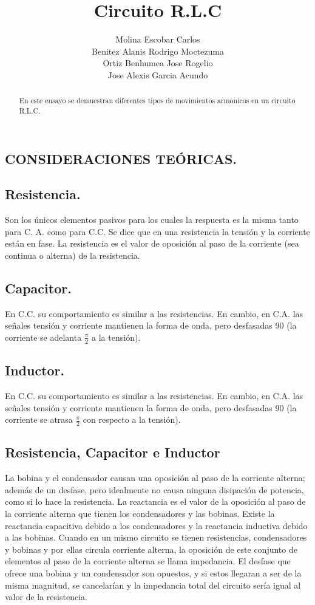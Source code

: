 \documentclass[11pt]{article}
\title{Circuito R.L.C}
\author{Molina Escobar Carlos\\Benitez Alanis Rodrigo Moctezuma\\Ortiz Benhumea Jose Rogelio\\Jose Alexis Garcia Acundo}
\date{}
\begin{document}
\maketitle

\begin{abstract}
En este ensayo se demuestran diferentes tipos de movimientos armonicos en un circuito R.L.C.
\end{abstract}


\begin{multicols}{2}

\section{CONSIDERACIONES TEÓRICAS.}
	\subsection{Resistencia.}
		Son los únicos elementos pasivos para los cuales la respuesta es la misma tanto para C. A. como para C.C. 
		Se dice que en una resistencia la tensión y la corriente están en fase.
		La resistencia es el valor de oposición al paso de la corriente (sea continua o alterna) de la resistencia.
	\subsection{Capacitor.}
		En C.C. su comportamiento es similar a las resistencias. 
		En cambio, en C.A. las señales tensión y corriente mantienen la forma de onda, pero desfasadas 90 (la corriente se adelanta $\frac{\pi}{2}$ a la tensión). 
	\subsection{Inductor.}
		En C.C. su comportamiento es similar a las resistencias.
		En cambio, en C.A. las señales tensión y corriente mantienen la forma de onda, pero desfasadas 90 (la corriente se atrasa $\frac{\pi}{2}$ con respecto a la tensión).
	\subsection{Resistencia, Capacitor e Inductor}
		La bobina y el condensador causan una oposición al paso de la corriente alterna; además de un desfase, pero idealmente no causa ninguna disipación de potencia, como si lo hace la resistencia.
		La reactancia es el valor de la oposición al paso de la corriente alterna que tienen los condensadores y las bobinas.
		Existe la reactancia capacitiva debido a los condensadores y la reactancia inductiva debido a las bobinas.
		Cuando en un mismo circuito se tienen resistencias, condensadores y bobinas y por ellas circula corriente alterna, la oposición de este conjunto de elementos al paso de la corriente alterna se llama impedancia.
		El desfase que ofrece una bobina y un condensador son opuestos, y si estos llegaran a ser de la misma magnitud, se cancelarían y la impedancia total del circuito sería igual al valor de la resistencia.

\end{multicols}
\end{document}
